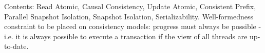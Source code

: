 \ac{Contents: Read Atomic, Causal Consistency, Update Atomic, Consistent Prefix, Parallel Snapshot Isolation, Snapshot Isolation, 
Serializability. Well-formedness constraint to be placed on consistency models: progress must always be possible - i.e. it is 
always possible to execute a transaction if the view of all threads are up-to-date.}  
